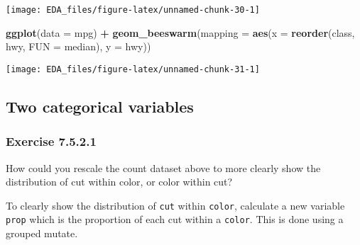 \documentclass[]{book}
\newenvironment{Shaded}{\begin{snugshade}}{\end{snugshade}}
\newcommand{\DataTypeTok}[1]{\textcolor[rgb]{0.13,0.29,0.53}{#1}}
\newcommand{\KeywordTok}[1]{\textcolor[rgb]{0.13,0.29,0.53}{\textbf{#1}}}
\newcommand{\NormalTok}[1]{#1}
\newcommand{\OperatorTok}[1]{\textcolor[rgb]{0.81,0.36,0.00}{\textbf{#1}}}
\newcommand{\StringTok}[1]{\textcolor[rgb]{0.31,0.60,0.02}{#1}}
\theoremstyle{plain}
\theoremstyle{remark}
\theoremstyle{definition}
\theoremstyle{definition}
\theoremstyle{definition}
\theoremstyle{remark}
\begin{document}
\begin{center}\texttt{[image: EDA\_files/figure-latex/unnamed-chunk-30-1]} \end{center}

\begin{Shaded}
\begin{Highlighting}[]
\KeywordTok{ggplot}\NormalTok{(}\DataTypeTok{data =}\NormalTok{ mpg) }\OperatorTok{+}
\StringTok{  }\KeywordTok{geom_beeswarm}\NormalTok{(}\DataTypeTok{mapping =} \KeywordTok{aes}\NormalTok{(}\DataTypeTok{x =} \KeywordTok{reorder}\NormalTok{(class, hwy, }\DataTypeTok{FUN =}\NormalTok{ median),}
                                 \DataTypeTok{y =}\NormalTok{ hwy))}
\end{Highlighting}
\end{Shaded}

\begin{center}\texttt{[image: EDA\_files/figure-latex/unnamed-chunk-31-1]} \end{center}

\hypertarget{two-categorical-variables}{%
\subsection{Two categorical variables}\label{two-categorical-variables}}

\hypertarget{exercise-7.5.2.1}{%
\subsubsection*{\texorpdfstring{Exercise
{7.5.2.1}}{Exercise 7.5.2.1}}\label{exercise-7.5.2.1}}

How could you rescale the count dataset above to more clearly show the
distribution of cut within color, or color within cut?

To clearly show the distribution of \texttt{cut} within \texttt{color},
calculate a new variable \texttt{prop} which is the proportion of each
cut within a \texttt{color}. This is done using a grouped mutate.
\end{document}
